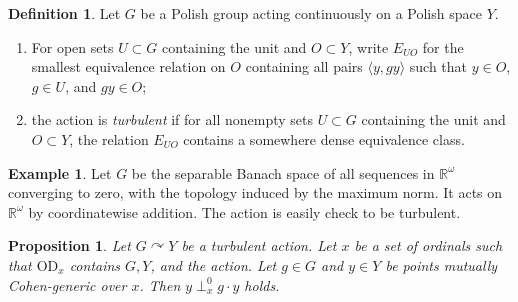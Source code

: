 \documentclass{article}
\newcommand{\gw}{\omega}
\newcommand{\acts}{\curvearrowright}
\newcommand{\vd}{\mathrm{OD}}
\newtheorem{proposition}[theorem]{Proposition}
\theoremstyle{definition}
\newtheorem{definition}[theorem]{Definition}
\newtheorem{example}[theorem]{Example}
\begin{document}
\begin{definition}
Let $G$ be a Polish group acting continuously on a Polish space $Y$.


\begin{enumerate}
\item For open sets $U\subset G$ containing the unit and $O\subset Y$, write $E_{UO}$ for the smallest equivalence relation on $O$ containing all pairs $\langle y, gy\rangle$ such that $y\in O$, $g\in U$, and $gy\in O$;
\item the action is \emph{turbulent} if for all nonempty sets $U\subset G$ containing the unit and $O\subset Y$, the relation $E_{UO}$ contains a somewhere dense equivalence class.
\end{enumerate}
\end{definition}

\begin{example}
\label{c0example}
Let $G$ be the separable Banach space of all sequences in $\mathbb{R}^\gw$ converging to zero, with the topology induced by the maximum norm. It acts on $\mathbb{R}^\gw$ by coordinatewise addition. The action is easily check to be turbulent.
\end{example}

\begin{proposition}
\label{0prop}
Let $G\acts Y$ be a turbulent action. Let $x$ be a set of ordinals such that $\vd_x$ contains $G, Y$, and the action. Let $g\in G$ and $y\in Y$ be points mutually Cohen-generic over $x$. Then $y\perp^0_xg\cdot y$ holds.
\end{proposition}
\end{document}

